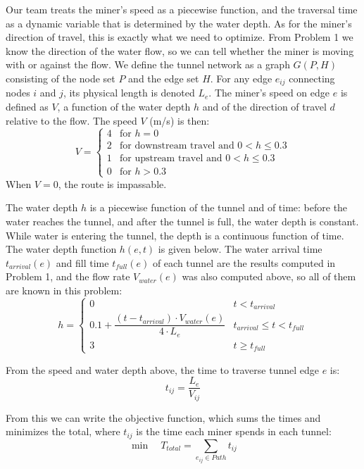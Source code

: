 \documentclass[12pt,a4paper]{article}
\begin{document}
Our team treats the miner's speed as a piecewise function, and the traversal time as a dynamic variable that is determined by the water depth. As for the miner's direction of travel, this is exactly what we need to optimize. From Problem 1 we know the direction of the water flow, so we can tell whether the miner is moving with or against the flow. We define the tunnel network as a graph $G(P,H)$ consisting of the node set $P$ and the edge set $H$. For any edge $e_{ij}$ connecting nodes $i$ and $j$, its physical length is denoted $L_e$. The miner's speed on edge $e$ is defined as $V$, a function of the water depth $h$ and of the direction of travel $d$ relative to the flow. The speed $V$ (m/s) is then:
\begin{equation}
  V = \begin{cases}
    4 & \text{for } h = 0\\
    2 & \text{for downstream travel and } 0 < h \le 0.3\\
    1 & \text{for upstream travel and } 0 < h \le 0.3\\
    0 & \text{for } h > 0.3
  \end{cases}
\end{equation}
When $V=0$, the route is impassable.

The water depth $h$ is a piecewise function of the tunnel and of time: before the water reaches the tunnel, and after the tunnel is full, the water depth is constant. While water is entering the tunnel, the depth is a continuous function of time. The water depth function $h(e,t)$ is given below. The water arrival time $t_{arrival}(e)$ and fill time $t_{full}(e)$ of each tunnel are the results computed in Problem 1, and the flow rate $V_{water}(e)$ was also computed above, so all of them are known in this problem:
\begin{equation}
  h = \begin{cases}
    0 & t < t_{arrival}\\[2pt]
    0.1 + \dfrac{(t - t_{arrival})\cdot V_{water}(e)}{4\cdot L_e} & t_{arrival} \le t < t_{full}\\[8pt]
    3 & t \ge t_{full}
  \end{cases}
\end{equation}

From the speed and water depth above, the time to traverse tunnel edge $e$ is:
\begin{equation}
  t_{ij} = \frac{L_e}{V_{ij}}
\end{equation}

From this we can write the objective function, which sums the times and minimizes the total, where $t_{ij}$ is the time each miner spends in each tunnel:
\begin{equation}
  \min\quad T_{total} = \sum_{e_{ij}\in Path} t_{ij}
\end{equation}
\end{document}
